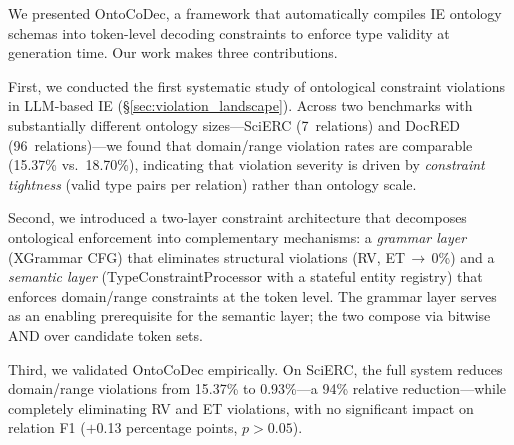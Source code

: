 
We presented OntoCoDec, a framework that automatically compiles IE ontology schemas into token-level decoding constraints to enforce type validity at generation time.
Our work makes three contributions.

First, we conducted the first systematic study of ontological constraint violations in LLM-based IE (\S\ref{sec:violation_landscape}).
Across two benchmarks with substantially different ontology sizes---SciERC (7~relations) and DocRED (96~relations)---we found that domain/range violation rates are comparable (15.37\% vs.\ 18.70\%), %
indicating that violation severity is driven by \emph{constraint tightness} (valid type pairs per relation) rather than ontology scale.

Second, we introduced a two-layer constraint architecture that decomposes ontological enforcement into complementary mechanisms:
a \emph{grammar layer} (XGrammar CFG) that eliminates structural violations (RV, ET\,$\to$\,0\%) and a \emph{semantic layer} (TypeConstraintProcessor with a stateful entity registry) that enforces domain/range constraints at the token level. %
The grammar layer serves as an enabling prerequisite for the semantic layer; the two compose via bitwise AND over candidate token sets.

Third, we validated OntoCoDec empirically.
On SciERC, the full system reduces domain/range violations from 15.37\% to 0.93\%---a 94\% relative reduction---while completely eliminating RV and ET violations, with no significant impact on relation F1 ($+$0.13 percentage points, $p > 0.05$). %

